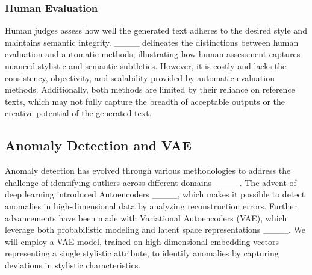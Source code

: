 \subsubsection{Human Evaluation}
Human judges assess how well the generated text adheres to the desired style and maintains semantic integrity. ____ delineates the distinctions between human evaluation and automatic methods, illustrating how human assessment captures nuanced stylistic and semantic subtleties. However, it is costly and lacks the consistency, objectivity, and scalability provided by automatic evaluation methods. Additionally, both methods are limited by their reliance on reference texts, which may not fully capture the breadth of acceptable outputs or the creative potential of the generated text. 

\subsection{Anomaly Detection and VAE}
Anomaly detection has evolved through various methodologies to address the challenge of identifying outliers across different domains ____. The advent of deep learning introduced Autoencoders ____, which makes it possible to detect anomalies in high-dimensional data by analyzing reconstruction errors. Further advancements have been made with Variational Autoencoders (VAE), which leverage both probabilistic modeling and latent space representations ____. We will employ a VAE model, trained on high-dimensional embedding vectors representing a single stylistic attribute, to identify anomalies by capturing deviations in stylistic characteristics.